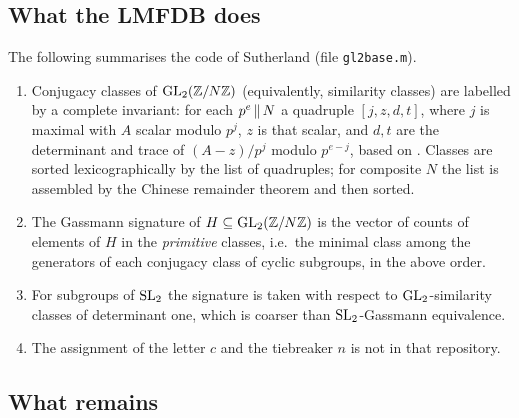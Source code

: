 \subsection{What the LMFDB does}
The following summarises the code of Sutherland \cite{SutherlandMagma}
(file \texttt{gl2base.m}).
\begin{enumerate}
\item Conjugacy classes of $\GL{2}{\ResidueRing{N}}$ (equivalently,
  similarity classes) are labelled by a complete invariant: for each
  $p^{e} \,\Vert\, N$ a quadruple $[j, z, d, t]$, where $j$ is maximal
  with $A$ scalar modulo $p^{j}$, $z$ is that scalar, and $d, t$ are the
  determinant and trace of $(A - z)/p^{j}$ modulo $p^{e-j}$, based on
  \cite{AvniOnnPrasadVaserstein2009}. Classes are sorted lexicographically
  by the list of quadruples; for composite $N$ the list is assembled by the
  Chinese remainder theorem and then sorted.
\item The Gassmann signature of $H \subseteq \GL{2}{\ResidueRing{N}}$ is the
  vector of counts of elements of $H$ in the \emph{primitive} classes,
  i.e.\ the minimal class among the generators of each conjugacy class of
  cyclic subgroups, in the above order.
\item For subgroups of $\SL{2}{}$ the signature is taken with respect to
  $\GL{2}{}$-similarity classes of determinant one, which is coarser than
  $\SL{2}{}$-Gassmann equivalence.
\item The assignment of the letter $c$ and the tiebreaker $n$ is not in that
  repository.
\end{enumerate}

\subsection{What remains}
